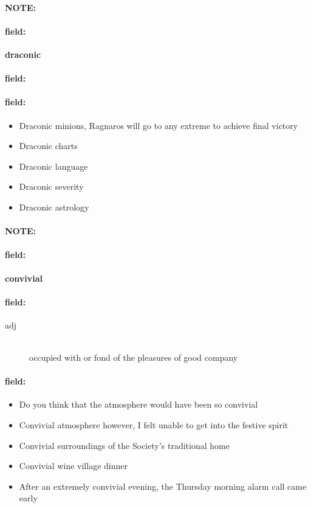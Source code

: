 \documentclass[12pt]{article}
\newenvironment{note}{\paragraph{NOTE:}}{}
\newenvironment{field}{\paragraph{field:}}{}
\begin{document}
\begin{note}
\begin{field}
\textbf{\large draconic}
\end{field}


\begin{field}
\end{field}

\begin{field}
\begin{itemize}
\item Draconic minions, Ragnaros will go to any extreme to achieve final victory
\item Draconic charts
\item Draconic language
\item Draconic severity
\item Draconic astrology
\end{itemize}
\end{field}
\end{note}
\begin{note}
\begin{field}
\textbf{\large convivial}
\end{field}


\begin{field}
\begin{description}
\item[adj] \hfill \\ 
occupied with or fond of the pleasures of good company

\end{description}
\end{field}

\begin{field}
\begin{itemize}
\item Do you think that the atmosphere would have been so convivial
\item Convivial atmosphere however, I felt unable to get into the festive spirit
\item Convivial surroundings of the Society's traditional home
\item Convivial wine village dinner
\item After an extremely convivial evening, the Thursday morning alarm call came early
\end{itemize}
\end{field}
\end{note}
\end{document}
